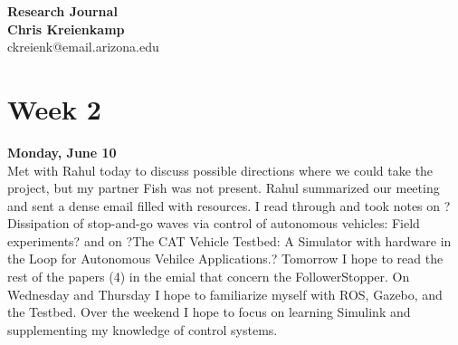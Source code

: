 \documentclass[12pt, letterpaper]{article}
\begin{document}

\makeatletter
\renewcommand\paragraph{%
    \@startsection{paragraph}{4}{\z@}%
    {-3.25ex\@plus -1ex \@minus -.2ex}%
    {0.01em}%
    {\normalfont\normalsize\bfseries}}
\makeatother


\begin{center}
{\Huge \bf Research Journal} \\
{\bf Chris Kreienkamp}\\
ckreienk@email.arizona.edu
\end{center}

\pagebreak


\noindent \section*{Week 2}

{\bf Monday, June 10} \\
Met with Rahul today to discuss possible directions where we could take the project, but my partner Fish was not present. Rahul summarized our meeting and sent a dense email filled with resources. I read through and took notes on ?Dissipation of stop-and-go waves via control of autonomous vehicles: Field experiments? and on ?The CAT Vehicle Testbed: A Simulator with hardware in the Loop for Autonomous Vehilce Applications.? Tomorrow I hope to read the rest of the papers (4) in the emial that concern the FollowerStopper. On Wednesday and Thursday I hope to familiarize myself with ROS, Gazebo, and the Testbed. Over the weekend I hope to focus on learning Simulink and supplementing my knowledge of control systems. \\
\end{document}
